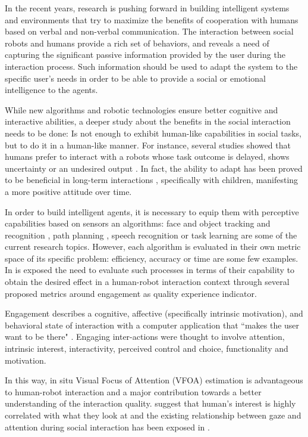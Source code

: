 \documentclass{sig-alternate}
\begin{document}
In the recent years, research is pushing forward in building intelligent systems and environments that try to maximize the benefits of cooperation with humans based on verbal and non-verbal communication. The interaction between social robots and humans provide a rich set of behaviors, and reveals a need of capturing the significant passive information provided by the user during the interaction process. Such information should be used to adapt the system to the specific user's needs in order to be able to provide a social or emotional intelligence to the agents. 

While new algorithms and robotic technologies ensure better cognitive and interactive abilities, a deeper study about the benefits in the social interaction needs to be done: Is not enough to exhibit human-like capabilities in social tasks, but to do it in a human-like manner. For instance, several studies showed that humans prefer to interact with a robots whose task outcome is delayed, shows uncertainty or an undesired output \cite{Admoni,Short}. In fact, the ability to adapt has been proved to be beneficial in long-term interactions \cite{Tielman:2014, Lim:2014}, specifically with children, manifesting a more positive attitude over time.

In order to build intelligent agents, it is necessary to equip them with perceptive capabilities based on sensors an algorithms: face and object tracking and recognition \cite{Zhao:2003, Jafri:2014}, path planning \cite{Galceran:2013}, speech recognition \cite{brick2007incremental} or task learning \cite{calinon2007learning} are some of the current research topics. However, each algorithm is evaluated in their own metric space of its specific problem: efficiency, accuracy or time are some few examples. In \cite{anzalone} is exposed the need to evaluate such processes in terms of their capability to obtain the desired effect in a human-robot interaction context through several proposed metrics around engagement as quality experience indicator.

Engagement describes a cognitive, affective (specifically intrinsic motivation), and behavioral state of interaction with a computer application that ``makes the user want to be there" \cite{OBrien:2010}. Engaging inter-actions were thought to involve attention, intrinsic interest, interactivity, perceived control and choice, functionality and motivation.

In this way, in situ Visual Focus of Attention (VFOA) estimation is advantageous to human-robot interaction and a major contribution towards a better understanding of the interaction quality. \cite{yarbus1967eye, barber1976perception} suggest that human's interest is highly correlated with what they look at and the existing relationship between gaze and attention during social interaction has been exposed in \cite{argyle1969social}.
\end{document}
